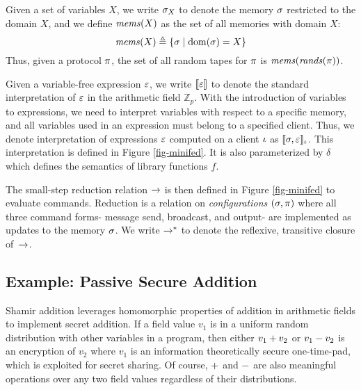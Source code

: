 Given a set of variables $X$, we write $\sigma_X$ to denote the
memory $\sigma$ restricted to the domain $X$, and we define
$\mathit{mems}(X)$ as the set of all memories with domain $X$:
$$
\mathit{mems}(X) \triangleq \{ \sigma \mid \mathrm{dom}(\sigma) = X \}
$$
Thus, given a protocol $\pi$, the set of all random tapes for
$\pi$ is $\mathit{mems}(\mathit{rands}(\pi))$.

Given a variable-free expression $\varepsilon$, we write $\llbracket \varepsilon \rrbracket$ to denote
the standard interpretation of $\varepsilon$ in the arithmetic field
$\mathbb{Z}_{p}$. With the introduction of variables to expressions,
we need to interpret variables with respect to a specific memory, and
all variables used in an expression must belong to a specified client.
Thus, we denote interpretation of expressions $\varepsilon$ computed on a
client $\iota$ as $\llbracket \sigma,\varepsilon \rrbracket_{\iota}$. This interpretation is
defined in Figure \ref{fig-minifed}. It is also parameterized by
$\delta$ which defines the semantics of library functions $f$.

The small-step reduction relation $\xrightarrow{}$ is then defined in Figure
\ref{fig-minifed} to evaluate commands. Reduction is a relation on
\emph{configurations} $(\sigma, \pi)$ where all three command forms-
message send, broadcast, and output- are implemented as updates to the
memory $\sigma$. We write $\xrightarrow{}^{*}$ to denote the reflexive, transitive
closure of\ $\xrightarrow{}$. 

\subsection{Example: Passive Secure Addition}
\label{section-lang-example}

Shamir addition leverages homomorphic properties of addition in
arithmetic fields to implement secret addition. If a field value $v_1$
is in a uniform random distribution with other variables in a program,
then either  $v_1 + v_2$ or $v_1 - v_2$  is an encryption of $v_2$
where $v_1$ is an information theoretically secure one-time-pad, which
is exploited for secret sharing. Of course, $+$ and $-$ are also
meaningful operations over any two field values regardless of their distributions.

